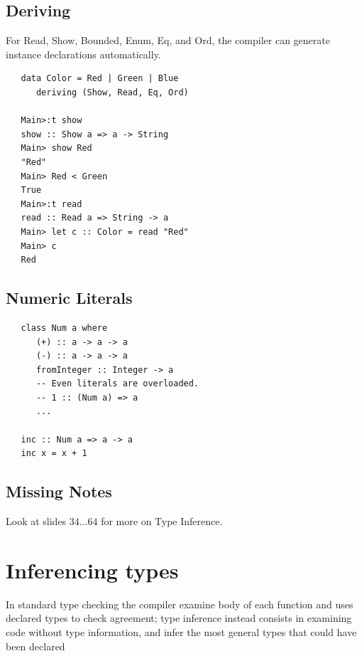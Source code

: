 \subsection{Deriving}
For Read, Show, Bounded, Enum, Eq, and Ord, the compiler
can generate instance declarations automatically.
\begin{lstlisting}
   data Color = Red | Green | Blue
      deriving (Show, Read, Eq, Ord)
   
   Main>:t show
   show :: Show a => a -> String
   Main> show Red
   "Red"
   Main> Red < Green
   True
   Main>:t read
   read :: Read a => String -> a
   Main> let c :: Color = read "Red"
   Main> c
   Red
\end{lstlisting}

\subsection{Numeric Literals}
\begin{lstlisting}
   class Num a where
      (+) :: a -> a -> a
      (-) :: a -> a -> a
      fromInteger :: Integer -> a
      -- Even literals are overloaded.
      -- 1 :: (Num a) => a
      ...

   inc :: Num a => a -> a
   inc x = x + 1
\end{lstlisting}


\subsection{Missing Notes}
Look at slides $34...64$ for more on Type Inference.

\section{Inferencing types}
In standard type checking the compiler examine body of each function and uses declared types to check agreement;
type inference instead consists in examining code without type information, and infer the
most general types that could have been declared

